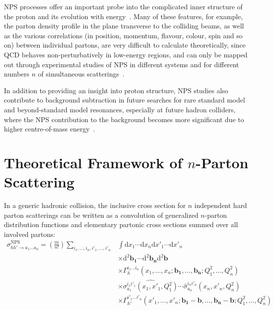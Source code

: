 \begin{survey}
NPS processes offer an important probe into the complicated inner structure of the proton and its evolution with energy~\cite{DIEHL_MPI,BLOK_MPS}. Many of these features, for example, the parton density profile in the plane transverse to the colliding beams, as well as the various correlations (in position, momentum, flavour, colour, spin and so on) between individual partons, are very difficult to calculate theoretically, since QCD behaves non-perturbatively in low-energy regions, and can only be mapped out through experimental studies of NPS in different systems and for different numbers $n$ of simultaneous scatterings~\cite{Z48W3VLV}.

In addition to providing an insight into proton structure, NPS studies also contribute to background subtraction in future searches for rare standard model and beyond-standard model resonances, especially at future hadron colliders, where the NPS contribution to the background becomes more significant due to higher centre-of-mass energy~\cite{WHQAFHD5,XREDRBCJ}.

\section{Theoretical Framework of \texorpdfstring{$n$}{n}-Parton Scattering}

In a generic hadronic collision, the inclusive cross section for $n$ independent hard parton scatterings can be written as a convolution of generalized $n$-parton distribution functions and elementary partonic cross sections summed over all involved partons:
\begin{equation}
    \label{eq:appendix-survey-nps-general}
    \begin{aligned}
        \sigma_{hh'\to a_1\dots a_n}^{\text{NPS}}
        =
        \left(\frac{m}{n!}\right) \sum_{i_1,\dots,i_n,i'_1,\dots,i'_n}
        &\int \mathrm{d} x_1 \cdots \mathrm{d} x_n \mathrm{d} x'_1 \cdots \mathrm{d} x'_n \\
        &\times \mathrm{d}^2 \mathbf{b_1} \cdots \mathrm{d}^2 \mathbf{b_n} \mathrm{d}^2 \mathbf{b} \\
        &\times \Gamma_h^{i_1\dots i_n}(x_1,\dots,x_n;\mathbf{b_1},\dots,\mathbf{b_n};Q_1^2,\dots,Q_n^2) \\
        &\times \hat{\sigma_{a_1}^{i_1 i'_1}(x_1,x'_1,Q_1^2)}\cdots \hat{\sigma}_{a_n}^{i_n i'_n}(x_n,x'_n,Q_n^2) \\
        &\times \Gamma_{h'}^{i'_1\dots i'_n}(x'_1,\dots,x'_n;\mathbf{b_1}-\mathbf{b},\dots,\mathbf{b_n}-\mathbf{b};Q_1^2,\dots,Q_n^2)
    \end{aligned}
\end{equation}


\end{survey}
